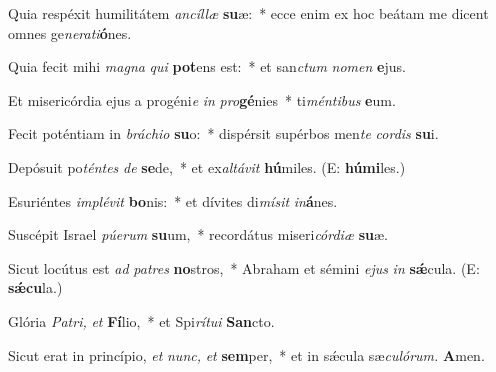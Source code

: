 \item Quia respéxit humilitátem \textit{ancíllæ} \textbf{su}æ:~* ecce enim ex hoc beátam me dicent omnes ge\textit{nerati}\textbf{ó}nes.
\item Quia fecit mihi \textit{magna} \textit{qui} \textbf{pot}ens est:~* et san\textit{ctum} \textit{nomen} \textbf{e}jus.
\item Et misericórdia ejus a progéni\textit{e} \textit{in} \textit{pro}\textbf{gé}nies~* ti\textit{méntibus} \textbf{e}um.
\item Fecit poténtiam in \textit{bráchio} \textbf{su}o:~* dispérsit supérbos men\textit{te} \textit{cordis} \textbf{su}i.
\item Depósuit po\textit{téntes} \textit{de} \textbf{se}de,~* et ex\tinyhspace\textit{altávit}  \textbf{hú}miles. (E: \textbf{hú}\textbf{mi}les.)
\item Esuriéntes \textit{implévit} \textbf{bo}nis:~* et dívites di\textit{mísit} \textit{in}\textbf{á}nes.
\item Suscépit Israel \textit{púerum} \textbf{su}um,~* recordátus miseri\teenyhspace\textit{córdiæ} \textbf{su}æ.
\item Sicut locútus est \textit{ad} \textit{patres} \textbf{no}stros,~* Abraham et sémini \textit{ejus} \textit{in} \textbf{sǽ}cula. (E: \textbf{sǽcu}la.)
\item Glória \textit{Patri,} \textit{et} \textbf{Fí}lio,~* et Spi\textit{rítui} \textbf{San}cto.
\item Sicut erat in princípio, \textit{et} \textit{nunc,} \textit{et} \textbf{sem}per,~* et in sǽcula sæ\teenyhspace\textit{culórum.} \textbf{A}men.